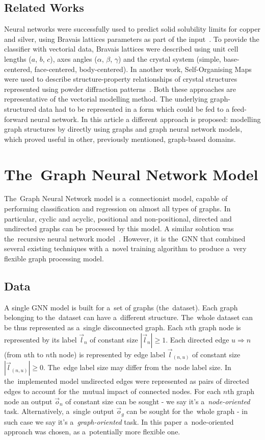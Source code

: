\documentclass{llncs}
\begin{document}
\subsection{Related Works}
Neural networks were successfully used to predict solid solubility limits for copper and silver, using Bravais lattices parameters as part of the input~\cite{zhang2008revisiting}. To provide the classifier with vectorial data, Bravais lattices were described using unit cell lengths ($a$, $b$, $c$), axes angles ($\alpha$, $\beta$, $\gamma$) and the crystal system (simple, base-centered, face-centered, body-centered). In another work, Self-Organising Maps were used to describe structure-property relationships of crystal structures represented using powder diffraction patterns~\cite{willighagen2007supervised}. Both these approaches are representative of the vectorial modelling method. The underlying graph-structured data had to be represented in a form which could be fed to a feed-forward neural network. In this article a different approach is proposed: modelling graph structures by directly using graphs and graph neural network models, which proved useful in other, previously mentioned, graph-based domains.


\section{The~Graph Neural Network Model}
The~Graph Neural Network model is a~connectionist model, capable of performing classification and regression on almost all types of graphs\cite{scarselli2009graph}. In particular, cyclic and acyclic, positional and non-positional, directed and undirected graphs can be processed by this model. A similar solution was the~recursive neural network model~\cite{bianchini2005recursive}. However, it is the~GNN that combined several existing techniques with a~novel training algorithm to produce a~very flexible graph processing model.

\subsection{Data}
A single GNN model is built for a~set of graphs (the~dataset). Each graph belonging to the~dataset can have a~different structure. The~whole dataset can be thus represented as a~single disconnected graph. Each $n$th graph node is represented by its label $\vec{l}_n$ of constant size $|\vec{l}_n| \geq 1$. Each directed edge $u \Rightarrow n$ (from $u$th to $n$th node) is represented by edge label $\vec{l}_{(n,u)}$ of constant size $|\vec{l}_{(n,u)}| \geq 0$. The~edge label size may differ from the~node label size. In the~implemented model undirected edges were represented as pairs of directed edges to account for the~mutual impact of connected nodes. For each $n$th graph node an output $\vec{o}_n$ of constant size can be sought - we say it's a~\emph{node-oriented} task. Alternatively, a~single output $\vec{o}_g$ can be sought for the~whole graph - in such case we say it's a~\emph{graph-oriented} task. In this paper a~node-oriented approach was chosen, as a~potentially more flexible one.
\end{document}

